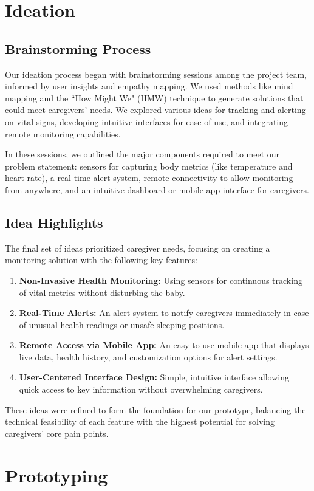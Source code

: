 \documentclass[12pt,a4paper]{report}
\begin{document}
\chapter{Ideation}
\section{Brainstorming Process}
Our ideation process began with brainstorming sessions among the project team, informed by user insights and empathy mapping. We used methods like mind mapping and the ``How Might We" (HMW) technique to generate solutions that could meet caregivers' needs. We explored various ideas for tracking and alerting on vital signs, developing intuitive interfaces for ease of use, and integrating remote monitoring capabilities.

In these sessions, we outlined the major components required to meet our problem statement: sensors for capturing body metrics (like temperature and heart rate), a real-time alert system, remote connectivity to allow monitoring from anywhere, and an intuitive dashboard or mobile app interface for caregivers.

\section{Idea Highlights}
The final set of ideas prioritized caregiver needs, focusing on creating a monitoring solution with the following key features:
\begin{enumerate}
  \item \textbf{Non-Invasive Health Monitoring:} Using sensors for continuous tracking of vital metrics without disturbing the baby.
  \item \textbf{Real-Time Alerts:} An alert system to notify caregivers immediately in case of unusual health readings or unsafe sleeping positions.
  \item \textbf{Remote Access via Mobile App:} An easy-to-use mobile app that displays live data, health history, and customization options for alert settings.
  \item \textbf{User-Centered Interface Design:} Simple, intuitive interface allowing quick access to key information without overwhelming caregivers.
\end{enumerate}
These ideas were refined to form the foundation for our prototype, balancing the technical feasibility of each feature with the highest potential for solving caregivers’ core pain points.

\chapter{Prototyping}
\end{document}
